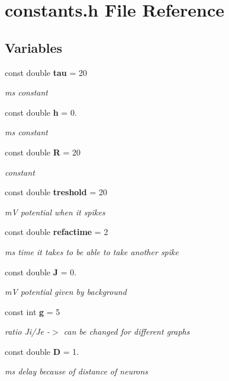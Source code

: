 \section{constants.\+h File Reference}
\label{constants_8h}
\subsection*{Variables}
\begin{DoxyCompactItemize}
\item 
const double \textbf{ tau} = 20
\begin{DoxyCompactList}\small\item\em ms constant \end{DoxyCompactList}\item 
const double \textbf{ h} = 0.
\begin{DoxyCompactList}\small\item\em ms constant \end{DoxyCompactList}\item 
const double \textbf{ R} = 20
\begin{DoxyCompactList}\small\item\em constant \end{DoxyCompactList}\item 
const double \textbf{ treshold} = 20
\begin{DoxyCompactList}\small\item\em mV potential when it spikes \end{DoxyCompactList}\item 
const double \textbf{ refactime} = 2
\begin{DoxyCompactList}\small\item\em ms time it takes to be able to take another spike \end{DoxyCompactList}\item 
const double \textbf{ J} = 0.
\begin{DoxyCompactList}\small\item\em mV potential given by background \end{DoxyCompactList}\item 
const int \textbf{ g} = 5
\begin{DoxyCompactList}\small\item\em ratio Ji/\+Je -\/$>$ can be changed for different graphs \end{DoxyCompactList}\item 
const double \textbf{ D} = 1.
\begin{DoxyCompactList}\small\item\em ms delay because of distance of neurons \end{DoxyCompactList}\item 

\end{DoxyCompactItemize}
